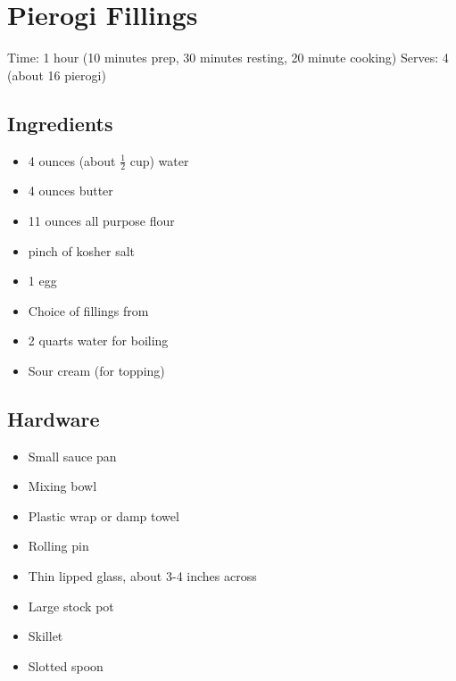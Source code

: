 \section{Pierogi Fillings}
\label{pierogiFillings}
\setcounter{secnumdepth}{0}
Time: 1 hour (10 minutes prep, 30 minutes resting, 20 minute cooking)
Serves: 4 (about 16 pierogi)

\begin{multicols}{2}
\subsection*{Ingredients}
\begin{itemize}
    \item 4 ounces (about \( \frac{1}{2} \) cup) water
    \item 4 ounces butter
    \item 11 ounces all purpose flour
    \item pinch of kosher salt
    \item 1 egg
    \item Choice of fillings from 
    \item 2 quarts water for boiling
    \item Sour cream (for topping)
\end{itemize}

\subsection*{Hardware}
\begin{itemize}
    \item Small sauce pan
    \item Mixing bowl
    \item Plastic wrap or damp towel
    \item Rolling pin
    \item Thin lipped glass, about 3-4 inches across
    \item Large stock pot
    \item Skillet
    \item Slotted spoon
\end{itemize}
\clearpage


\end{multicols}
